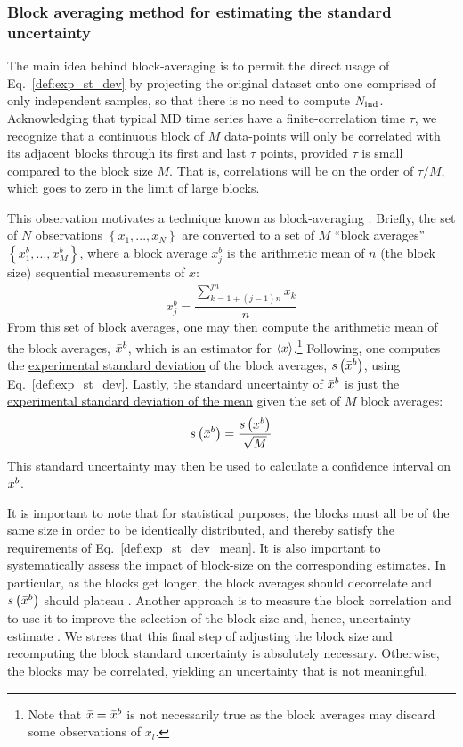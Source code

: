 \subsubsection{Block averaging method for estimating the standard uncertainty}\label{sec:blockavg}

The main idea behind block-averaging is to permit the direct usage of Eq.~\eqref{def:exp_st_dev} by projecting the original dataset onto one comprised of only independent samples, so that there is no need to compute $N_{\rm ind}$.  Acknowledging that typical MD time series have a finite-correlation time $\tau$, we recognize that a continuous block of $M$ data-points will only be correlated with its adjacent blocks through its first and last $\tau$ points, provided $\tau$ is small compared to the block size $M$.   That is, correlations will be on the order of $\tau / M$, which goes to zero in the limit of large blocks.

This observation motivates a technique known as block-averaging \cite{Friedberg1970,Flyvbjerg-1989,FrenkelSmit2002,Grossfield2009}.
Briefly, the set of $N$ observations $\left\{x_1, ..., x_N\right\}$ are converted to a set of $M$ ``block averages'' $\left\{x^b_1, ..., x^b_{M}\right\}$, where a block average $x^b_j$ is the \hyperref[def:arith_mean]{arithmetic mean} of $n$ (the block size) sequential measurements of $x$:
%
\begin{equation}
  x^b_j = \dfrac{\sum\limits_{k=1+(j-1)n}^{jn} x_k}{n}
\end{equation}
%
From this set of block averages, one may then compute the arithmetic mean of the block averages, $\bar{x}^b$, which is an estimator for $\langle x \rangle$.\footnote{Note that $\bar{x} = \bar{x}^b$ is not necessarily true as the block averages may discard some observations of $x_l$.}
Following, one computes the \hyperref[def:exp_st_dev]{experimental standard deviation} of the block averages, $s\left( \bar{x}^b \right)$, using Eq.~\ref{def:exp_st_dev}.
Lastly, the standard uncertainty of $\bar{x}^b$ is just the \hyperref[def:exp_st_dev_mean]{experimental standard deviation of the mean} given the set of $M$ block averages:
%
\begin{equation}
  s\left( \bar{x}^b \right) = \dfrac{s\left( x^b \right)}{\sqrt{M}}
\end{equation}
%
This standard uncertainty may then be used to calculate a confidence interval on $\bar{x}^b$.

It is important to note that for statistical purposes, the blocks must all be of the same size in order to be identically distributed, and thereby satisfy the requirements of Eq.~\ref{def:exp_st_dev_mean}.  It is also important to  systematically assess the impact of block-size on the corresponding estimates.  In particular, as the blocks get longer, the block averages should decorrelate and $s\left( \bar{x}^b \right)$ should plateau \cite{Flyvbjerg-1989,Grossfield2009}.
Another approach is to measure the block correlation and to use it to improve the selection of the block size and, hence, uncertainty estimate \cite{Kolafa1986}.
We stress that this final step of adjusting the block size and recomputing the block standard uncertainty is absolutely necessary. Otherwise, the blocks may be correlated, yielding an uncertainty that is not meaningful.



